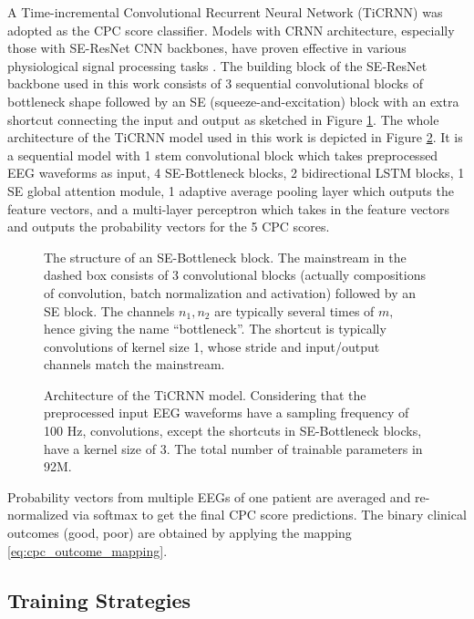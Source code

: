 A Time-incremental Convolutional Recurrent Neural Network (TiCRNN) \cite{Kang_2022_cinc2021_iop} was adopted as the CPC score classifier. Models with CRNN architecture, especially those with SE-ResNet \cite{hu2020senet} CNN backbones, have proven effective in various physiological signal processing tasks \cite{Kang_2022_cinc2021_iop, wen_cinc2022}. The building block of the SE-ResNet backbone used in this work consists of 3 sequential convolutional blocks of bottleneck shape followed by an SE (squeeze-and-excitation) block with an extra shortcut connecting the input and output as sketched in Figure \ref{fig:se_bottleneck}. The whole architecture of the TiCRNN model used in this work is depicted in Figure \ref{fig:model_arch}. It is a sequential model with 1 stem convolutional block which takes preprocessed EEG waveforms as input, 4 SE-Bottleneck blocks, 2 bidirectional LSTM blocks, 1 SE global attention module, 1 adaptive average pooling layer which outputs the feature vectors, and a multi-layer perceptron which takes in the feature vectors and outputs the probability vectors for the 5 CPC scores.

\begin{figure}[!htp]
\centering

\caption{The structure of an SE-Bottleneck block. The mainstream in the dashed box consists of 3 convolutional blocks (actually compositions of convolution, batch normalization and activation) followed by an SE block. The channels $n_1, n_2$ are typically several times of $m,$ hence giving the name ``bottleneck''. The shortcut is typically convolutions of kernel size 1, whose stride and input/output channels match the mainstream.}
\label{fig:se_bottleneck}
\end{figure}

\begin{figure}[!htp]
\centering

\caption{Architecture of the TiCRNN model. Considering that the preprocessed input EEG waveforms have a sampling frequency of 100 Hz, convolutions, except the shortcuts in SE-Bottleneck blocks, have a kernel size of 3. The total number of trainable parameters in 92M.}
\label{fig:model_arch}
\end{figure}

Probability vectors from multiple EEGs of one patient are averaged and re-normalized via softmax to get the final CPC score predictions. The binary clinical outcomes (good, poor) are obtained by applying the mapping \eqref{eq:cpc_outcome_mapping}.

\subsection{Training Strategies}
\label{subsec:training}


